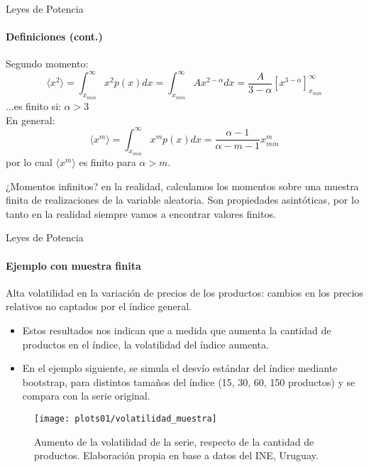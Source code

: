 \documentclass[11pt]{beamer}
\begin{document}
\begin{frame}{Leyes de Potencia}
\framesubtitle{Definiciones (cont.)}
Segundo momento:
\begin{equation*}
\langle x^{2} \rangle = \int_{x_{min}}^{\infty} x^{2}p(x)dx=\int_{x_{min}}^{\infty}Ax^{2-\alpha}dx=\dfrac{A}{3-\alpha}\left[x^{3-\alpha}\right] _{x_{min}}^{\infty}
\end{equation*}
...es finito si: \pause \color{blue} \textbf{$\alpha > 3$ } \color{black}\\
\vspace{0.3cm}
En general: 
\begin{equation*}
\langle x^{m} \rangle = \int_{x_{min}}^{\infty} x^{m}p(x)dx=\dfrac{\alpha-1}{\alpha - m -1}x^{m}_{min} 
\end{equation*}
por lo cual $\langle x^{m} \rangle$ es finito para $\alpha > m$.\\
\vspace{0.3cm}

¿Momentos infinitos? \pause en la realidad, calculamos los momentos sobre una muestra finita de realizaciones de la variable aleatoria. Son propiedades asintóticas, por lo tanto en la realidad siempre vamos a encontrar valores finitos. 
\end{frame}

\begin{frame}{Leyes de Potencia}
\framesubtitle{Ejemplo con muestra finita}
Alta volatilidad en la variación de precios de los productos: cambios en los precios relativos no captados por el índice general.
\begin{multicols}{2} 
{\small \begin{itemize}
	\item Estos resultados nos indican que a medida que aumenta la cantidad de productos en el índice, la volatilidad del índice aumenta.
	\item En el ejemplo siguiente, se simula el desvío estándar del índice mediante bootstrap, para distintos tamaños del índice (15, 30, 60, 150 productos) y se compara con la serie original.
\end{itemize}}
	\begin{figure}
	\centering
	\texttt{[image: plots01/volatilidad\_muestra]}
	\caption{{\footnotesize Aumento de la volatilidad de la serie, respecto de la cantidad de productos. Elaboración propia en base a datos del INE, Uruguay.}}
	\label{fig:logexpinfl12}
\end{figure}
\end{multicols}
\end{frame}
\end{document}

